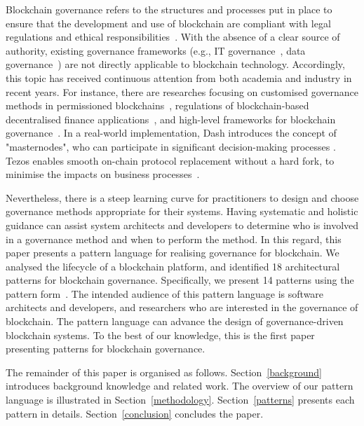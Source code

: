 \documentclass{article}
\begin{document}
Blockchain governance refers to the structures and processes put in place to ensure that the development and use of blockchain are compliant with legal regulations and ethical responsibilities~\cite{liu2021systematic}. With the absence of a clear source of authority, existing governance frameworks (e.g., IT governance~\cite{weill2004governance, cobit2012business}, data governance~\cite{ballard2014ibm, ISO38505}) are not directly applicable to blockchain technology. Accordingly, this topic has received continuous attention from both academia and industry in recent years. For instance, there are researches focusing on customised governance methods in permissioned blockchains~\cite{selected1, selected14}, regulations of blockchain-based decentralised finance applications~\cite{selected3, selected16}, and high-level frameworks for blockchain governance~\cite{selected11, selected14, hofman2021blockchain}. In a real-world implementation, Dash introduces the concept of "masternodes", who can participate in significant decision-making processes \cite{dash_whitepaper}. Tezos enables smooth on-chain protocol replacement without a hard fork, to minimise the impacts on business processes~\cite{tezos_whitepaper}. 



Nevertheless, there is a steep learning curve for practitioners to design and choose governance methods appropriate for their systems. Having systematic and holistic guidance can assist system architects and developers to determine who is involved in a governance method and when to perform the method. In this regard, this paper presents a pattern language for realising governance for blockchain. We analysed the lifecycle of a blockchain platform, and identified 18 architectural patterns for blockchain governance. Specifically, we present 14 patterns using the pattern form~\cite{patternLanguage}. The intended audience of this pattern language is software architects and developers, and researchers who are interested in the governance of blockchain. The pattern language can advance the design of governance-driven blockchain systems. To the best of our knowledge, this is the first paper presenting patterns for blockchain governance.



The remainder of this paper is organised as follows. Section~\ref{background} introduces background knowledge and related work. The overview of our pattern language is illustrated in Section~\ref{methodology}. Section~\ref{patterns} presents each pattern in details. Section~\ref{conclusion} concludes the paper.
\end{document}
